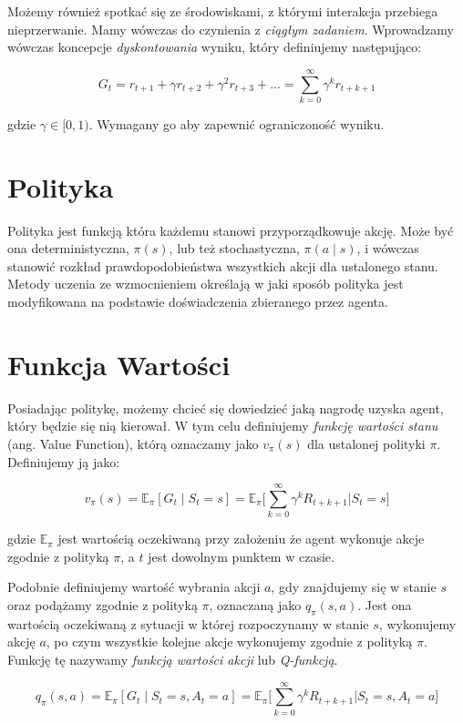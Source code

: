 \documentclass[licencjacka]{pracamgr}
\begin{document}
Możemy również spotkać się ze środowiskami, z którymi interakcja przebiega nieprzerwanie. Mamy wówczas do czynienia z \emph{ciągłym zadaniem}. Wprowadzamy wówczas koncepcje \emph{dyskontowania} wyniku, który definiujemy następująco:

$$ G_t = r_{t+1} + \gamma r_{t+2} + \gamma^2 r_{t+3} + ... = 
\sum_{k=0}^{\infty} \gamma^k r_{t+k+1} $$

gdzie $ \gamma \in [0, 1) $. Wymagany go aby zapewnić ograniczoność wyniku.


\section{Polityka}

Polityka jest funkcją która każdemu stanowi przyporządkowuje akcję. Może być ona deterministyczna, $ \pi(s) $, lub też stochastyczna, $ \pi(a \mid s) $, i wówczas stanowić rozkład prawdopodobieństwa wszystkich akcji dla ustalonego stanu. Metody uczenia ze wzmocnieniem określają w jaki sposób polityka jest modyfikowana na podstawie doświadczenia zbieranego przez agenta.

\section{Funkcja Wartości}

Posiadając politykę, możemy chcieć się dowiedzieć jaką nagrodę uzyska agent, który będzie się nią kierował. W tym celu definiujemy \emph{funkcję wartości stanu} (ang. Value Function), którą oznaczamy jako $ v_{\pi}(s) $ dla ustalonej polityki $ \pi $. Definiujemy ją jako:

$$ v_{\pi}(s) = \mathbb{E}_{\pi}[G_t \mid S_t = s] = \mathbb{E}_{\pi} \Bigg[ \sum_{k=0}^{\infty} \gamma^k R_{t+k+1} \bigg| S_t = s \Bigg] $$

gdzie $ \mathbb{E}_{\pi} $ jest wartością oczekiwaną przy założeniu że agent wykonuje akcje zgodnie z polityką $\pi$, a $t$ jest dowolnym punktem w czasie. 

Podobnie definiujemy wartość wybrania akcji $a$, gdy znajdujemy się w stanie $s$ oraz podążamy zgodnie z polityką $\pi$, oznaczaną jako $q_{\pi}(s, a)$. Jest ona wartością oczekiwaną z sytuacji w której rozpoczynamy w stanie $s$, wykonujemy akcję $a$, po czym wszystkie kolejne akcje wykonujemy zgodnie z polityką $\pi$. Funkcję tę nazywamy \emph{funkcją wartości akcji} lub \emph{Q-funkcją}.

$$ q_{\pi}(s, a) = \mathbb{E}_{\pi}[G_t \mid S_t = s, A_t = a] = \mathbb{E}_{\pi} \Bigg[ \sum_{k=0}^{\infty} \gamma^k R_{t+k+1} \bigg| S_t = s, A_t = a \Bigg] $$
\end{document}
